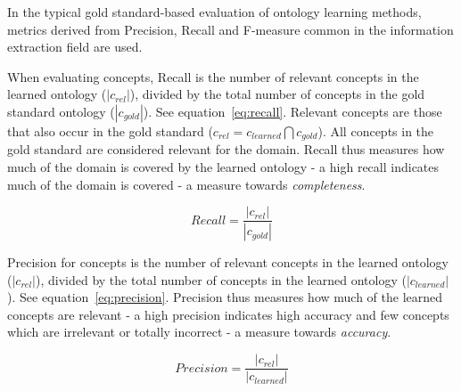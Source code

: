 \documentclass[a4paper]{report}
\newcommand{\todo}[1]{}
\begin{document}
In the typical gold standard-based evaluation of ontology learning methods, metrics derived from Precision, Recall and F-measure common in the information extraction field are used\cite{Wong11Survey}.

When evaluating concepts, Recall is the number of relevant concepts in the learned ontology (\(|c_{rel}|\)), divided by the total number of concepts in the gold standard ontology (\(|c_{gold}|\))\cite{Dellschaft08EvalStrateg}.
See equation~\ref{eq:recall}.
Relevant concepts are those that also occur in the gold standard (\(c_{rel} = c_{learned} \bigcap c_{gold}\)).
All concepts in the gold standard are considered relevant for the domain.
Recall thus measures how much of the domain is covered by the learned ontology - a high recall indicates much of the domain is covered - a measure towards \emph{completeness}.

\begin{equation}
\label{eq:recall}
 Recall = \frac{|c_{rel}|}{|c_{gold}|}
\end{equation}

Precision for concepts is the number of relevant concepts in the learned ontology (\(|c_{rel}|\)), divided by the total number of concepts in the learned ontology (\(|c_{learned}|\))\cite{Dellschaft08EvalStrateg}.
See equation~\ref{eq:precision}.
Precision thus measures how much of the learned concepts are relevant - a high precision indicates high accuracy and few concepts which are irrelevant or totally incorrect - a measure towards \emph{accuracy}.

\begin{equation}
\label{eq:precision}
 Precision = \frac{|c_{rel}|}{|c_{learned}|}
\end{equation}

\todo{possibly add f-measure}
\end{document}
